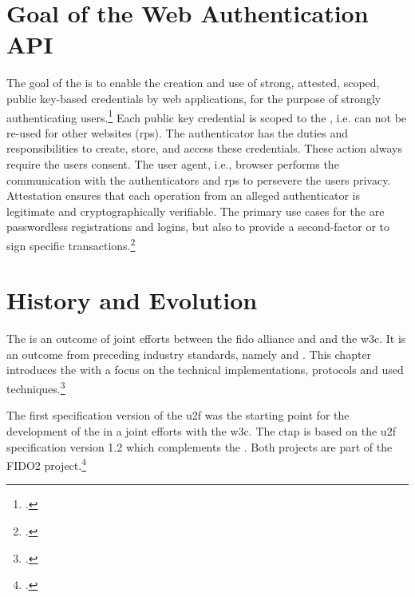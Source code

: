 
\section{Goal of the Web Authentication API}

The goal of the \wa{} is to enable \frqq the creation and use of strong, attested, scoped, public key-based credentials by web applications, for the purpose of strongly authenticating users\flqq.\footcites[See][Abstract]{w3c} Each public key credential is scoped to the , i.e. can not be re-used for other websites (\glspl{rp}). The authenticator has the duties and responsibilities to create, store, and access these credentials. These action always require the users consent. The user agent, i.e., browser performs the communication with the authenticators and \glspl{rp} to persevere the users privacy. Attestation ensures that each operation from an alleged authenticator is legitimate and cryptographically verifiable. The primary use cases for the \wa{} are passwordless registrations and logins, but also to provide a second-factor or to sign specific transactions.\footcites[See][Abstract, Chapter 1.2]{w3c}

\section{History and Evolution}

The \wa{} is an outcome of joint efforts between	 the \gls{fido} alliance and and the \gls{w3c}. It is an outcome from preceding industry standards, namely  and . This chapter introduces the \wa{} with a focus on the technical implementations, protocols and used techniques.\footcites[See][24]{fido-ct-3}

The first specification version of the \gls{u2f} was the starting point for the development of the \wa{} in a joint efforts with the \gls{w3c}. The \gls{ctap} is based on the \gls{u2f} specification version 1.2 which complements the \wa. Both projects are part of the FIDO2 project.\footcite[See][169--170]{grimes2017hacking}
